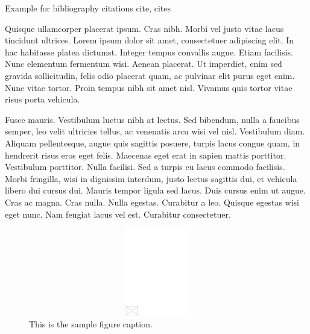\documentclass[AMA,STIX1COL]{WileyNJD-SP}
\begin{document}
Example for bibliography citations cite\cite{Taylor1937}, cites\cite{Knupp1999,Kamm2000}

Quisque ullamcorper placerat ipsum. Cras nibh.\cite{Kucharik2003,Blanchard2015} Morbi vel justo vitae lacus tincidunt ultrices. Lorem ipsum dolor sit
amet, consectetuer adipiscing elit. In hac habitasse platea dictumst. Integer tempus convallis augue. Etiam facilisis.
Nunc elementum fermentum wisi. Aenean placerat. Ut imperdiet, enim sed gravida sollicitudin, felis odio placerat
quam, ac pulvinar elit purus eget enim. Nunc vitae tortor. Proin tempus nibh sit amet nisl. Vivamus quis tortor
vitae risus porta vehicula.

Fusce mauris. Vestibulum luctus nibh at lectus. Sed bibendum, nulla a faucibus semper, leo velit ultricies tellus, ac
venenatis arcu wisi vel nisl. Vestibulum diam. Aliquam pellentesque, augue quis sagittis posuere, turpis lacus congue
quam, in hendrerit risus eros eget felis. Maecenas eget erat in sapien mattis porttitor. Vestibulum porttitor. Nulla facilisi. Sed a turpis eu lacus commodo facilisis. Morbi fringilla, wisi in dignissim interdum, justo lectus sagittis dui, et
vehicula libero dui cursus dui. Mauris tempor ligula sed lacus. Duis cursus enim ut augue. Cras ac magna. Cras nulla.
Nulla egestas. Curabitur a leo. Quisque egestas wisi eget nunc. Nam feugiat lacus vel est. Curabitur consectetuer.


\begin{figure}[t]
\centerline{\includegraphics[width=342pt,height=9pc,draft]{empty}}
\caption{This is the sample figure caption.\label{fig1}}
\end{figure}
\end{document}

